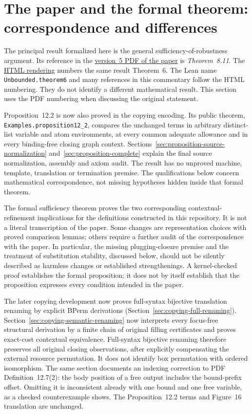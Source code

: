 \section{The paper and the formal theorem: correspondence and differences}
\label{sec:paper-correspondence}

The principal result formalized here is the general sufficiency-of-robustness
argument. Its reference in the
\href{https://arxiv.org/pdf/1907.01257v5\#page=30}{version~5 PDF of the paper}
is \emph{Theorem~8.11}. The
\href{https://arxiv.org/html/1907.01257v5\#S8.SS4}{HTML rendering}
numbers the same result Theorem~6. The Lean name \texttt{Unbounded.theorem6}
and many references in this commentary follow the HTML numbering. They do not
identify a different mathematical result. This section uses the PDF numbering
when discussing the original statement.

{\raggedright
Proposition~12.2 is now also proved in the copying encoding.
Its public theorem, \texttt{Examples.proposition12\_2}, compares the unchanged terms in
arbitrary distinct-list variable and atom environments, at every common
adequate allowance and in every binding-free closing graph context.
Sections~\ref{sec:proposition-source-normalization} and~\ref{sec:proposition-complete}
explain the final source normalization, assembly and axiom audit. The result
has no unproved machine, template, translation or termination premise.
The qualifications below concern mathematical correspondence, not missing
hypotheses hidden inside that formal theorem.\par}

The formal sufficiency theorem proves the two corresponding contextual-refinement
implications for the definitions constructed in this repository. It is not a
literal transcription of the paper. Some changes are representation choices
with proved comparison lemmas; others require a further audit of the
correspondence with the paper. In particular, the missing plugging-closure
premise and the treatment of substitution stability, discussed below, should
not be silently described as harmless changes or established strengthenings.
A kernel-checked proof establishes the formal proposition; it does not by
itself establish that the proposition expresses every condition intended in
the paper.


The later copying development now proves full-syntax bijective translation
renaming by explicit BPerm derivations (Section~\ref{sec:copying-full-renaming}).
Section~\ref{sec:copying-semantic-renaming} now interprets every focus-free
structural derivation by a finite chain of original filling certificates and
proves exact-cost contextual equivalence. Full-syntax bijective renaming
therefore preserves all original closing observations, after explicitly
compensating the external resource permutation. It does not identify box
permutation with ordered isomorphism. The same section documents an indexing correction to
PDF Definition~12.7(2): the body position of a free output includes the bound-prefix
offset. Omitting it is inconsistent already with one bound and one free variable,
as a checked counterexample shows. The Proposition~12.2 terms and Figure~16
translation are unchanged.


